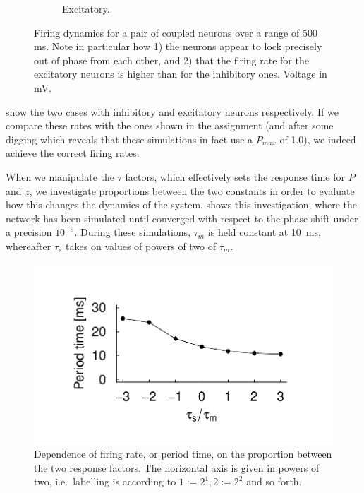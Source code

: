 \documentclass[10pt]{article}
\theoremstyle{plain}
\begin{document}
\begin{multicols*}{2}
\begin{figure}[H]
\begin{subfigure}[t]{.5\textwidth}
    \caption{Excitatory.}
    \label{fig:excit}
  \end{subfigure}%
  \caption{Firing dynamics for a pair of coupled neurons over a range of 500 ms. Note in particular how
1) the neurons appear to lock precisely out of phase from each other, and 2)
that the firing rate for the excitatory neurons is higher than for the
inhibitory ones. Voltage in mV.}
\label{fig:neurons}
\end{figure}

 show the two cases with inhibitory and excitatory
neurons respectively. If we compare these rates with the ones shown in the
assignment (and after some digging which reveals that these simulations in fact use a
$P_{max}$ of 1.0), we indeed achieve the correct firing rates. 

When we manipulate the $\tau$ factors, which effectively sets the response time
for $P$ and $z$, we investigate proportions between the two constants in order
to evaluate how this changes the dynamics of the system.  shows
this investigation, where the network has been simulated until converged with
respect to the phase shift under a precision $10^{-5}$. During these
simulations, $\tau_m$ is held constant at 10~ms, whereafter $\tau_s$ takes on
values of powers of two of $\tau_m$. 
\begin{figure}[H]
  \centering
  \includegraphics[trim={0 1cm 0 1.cm}, clip, scale=.55]{taus}
  \caption{Dependence of firing rate, or period time, on the proportion
  between the two response factors. The horizontal axis is given in powers
of two, i.e.\ labelling is according to $1 := 2^1, 2 := 2^2$ and so forth.}
  \label{fig:taus}
\end{figure}


\end{multicols*}
\end{document}
